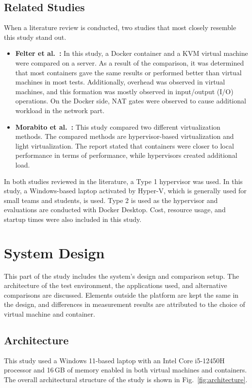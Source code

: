 \documentclass[conference,a4paper]{IEEEtran}
\begin{document}
\subsection{Related Studies}
When a literature review is conducted, two studies that most closely resemble this study stand out.
\begin{itemize}
	\item \textbf{Felter et al.~\cite{b6}:} In this study, a Docker container and a KVM virtual machine were compared on a server. As a result of the comparison, it was determined that most containers gave the same results or performed better than virtual machines in most tests. Additionally, overhead was observed in virtual machines, and this formation was mostly observed in input/output (I/O) operations. On the Docker side, NAT gates were observed to cause additional workload in the network part.
	\item \textbf{Morabito et al.~\cite{b7}:} This study compared two different virtualization methods. The compared methods are hypervisor-based virtualization and light virtualization. The report stated that containers were closer to local performance in terms of performance, while hypervisors created additional load.
\end{itemize}
In both studies reviewed in the literature, a Type 1 hypervisor was used. In this study, a Windows-based laptop activated by Hyper-V, which is generally used for small teams and students, is used. Type 2 is used as the hypervisor and evaluations are conducted with Docker Desktop. Cost, resource usage, and startup times were also included in this study.

\section{System Design}
\label{sec:design}

This part of the study includes the system's design and comparison setup. The architecture of the test environment, the applications used, and alternative comparisons are discussed. Elements outside the platform are kept the same in the design, and differences in measurement results are attributed to the choice of virtual machine and container.

\subsection{Architecture}
This study used a Windows 11-based laptop with an Intel Core i5-12450H processor and 16\,GB of memory enabled in both virtual machines and containers. The overall architectural structure of the study is shown in Fig.~\ref{fig:architecture}.
\end{document}
